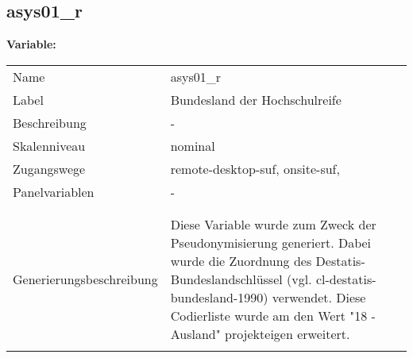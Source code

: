 	
	
	\subsection{asys01\_r}
	\label{subSection:asys01_r}

	\noindent\textbf{Variable:}\\
		\begin{tabular}{lL{11.3cm}}
			\label{tableVariable:asys01_r}
			Name & asys01\_r \\
			Label & Bundesland der Hochschulreife \\
			Beschreibung & - \\
			Skalenniveau & nominal \\
			Zugangswege &
				remote-desktop-suf,
				onsite-suf,
 \\
			Panelvariablen & -
			 \\
			 \\
 \\
					Generierungsbeschreibung & Diese Variable wurde zum Zweck der Pseudonymisierung generiert. Dabei wurde die Zuordnung des Destatis-Bundeslandschlüssel (vgl. cl-destatis-bundesland-1990) verwendet. Diese Codierliste wurde am den Wert "18 - Ausland" projekteigen erweitert.
				 \\	
			 \\
		\end{tabular}






